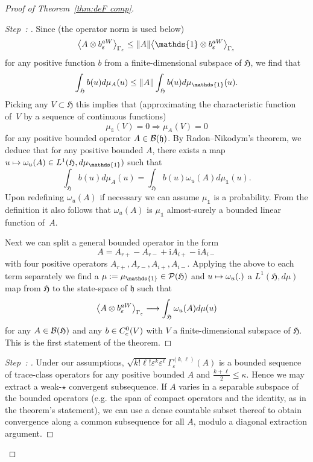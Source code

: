 \documentclass[10pt]{amsart}
\theoremstyle{definition}\newtheorem{defi}[theo]{Definition}\newtheorem{rema}[theo]{Remark}\newtheorem{exam}[theo]{Example}\newtheorem{exem}[theo]{Example}\newtheorem{nota}[theo]{Notation}
\newcommand{\im}{\mathrm{i}}
\newcommand{\gH}{\mathfrak{H}}
\newcommand{\gh}{\mathfrak{h}}
\newcommand{\cB}{\mathcal{B}}
\newcommand{\cP}{\mathcal{P}}
\newcommand{\1}{\mathds{1}}
\newcommand{\eps}{\varepsilon}
\let\oldin\in
\renewcommand{\in}{\mathchoice{\oldin}{\oldin}{\,\oldin\,}{\,\oldin\,}}
\renewcommand*{\to}{\mathchoice{\longrightarrow}{\rightarrow}{\rightarrow}{\rightarrow}}
\let\oldmapsto\mapsto
\renewcommand*{\mapsto}{\mathchoice{\longmapsto}{\oldmapsto}{\oldmapsto}{\oldmapsto}}
\newcounter{setofstep}
\newcounter{step}[setofstep]
\newenvironment{step}[1][]{\refstepcounter{step}\begin{proof}[{Step~\thestep\if#1\empty\else: #1\fi}]}{\let\qed\relax\end{proof}}
\let\originalleft\left
\let\originalright\right
\renewcommand{\left}{\mathopen{}\mathclose\bgroup\originalleft}
\renewcommand{\right}{\aftergroup\egroup\originalright}
\newenvironment{proofc}[1][\proofname]{\begin{proof}[#1]}{\end{proof}}
\begin{document}
\begin{proofc}[Proof of Theorem~\ref{thm:deF comp}]
\begin{step}
Since (the operator norm is used below)
\begin{equation*}
\left\langle A \otimes b_{\eps}^{aW}\right\rangle _{\Gamma_\eps} \leq \left\| A \right\| \left\langle \1 \otimes b_{\eps}^{aW}\right\rangle _{\Gamma_\eps}
\end{equation*}
for any positive function $b$ from a finite-dimensional subspace of $\gH$, we find that
\begin{equation*}
\int_ \gH b(u) d\mu_A (u) \leq \left\| A \right\| \int_ \gH b(u) d\mu_\1 (u).
\end{equation*}
Picking any $V \subset \gH$ this implies that (approximating the characteristic function of~$V$ by a sequence of continuous functions)
\begin{equation*}
\mu_\1 (V) = 0 \Rightarrow \mu_A (V) = 0
\end{equation*}
for any positive
bounded operator $A\in \cB (\gh)$. By Radon--Nikodym's theorem, we deduce that for any positive bounded $A$, there exists a map $u\mapsto\omega_u (A) \in L^1 (\gH, d\mu_\1)$ such that
\begin{equation*}
\int_ \gH b(u) d\mu_A (u) = \int_ \gH b(u) \omega_u(A) d\mu_\1 (u).
\end{equation*}
Upon redefining $\omega_u(A)$ if necessary we can assume $\mu_\1$ is a probability. From the definition it also follows that $\omega_u(A)$ is $\mu_\1$ almost-surely a bounded linear function of~$A$.

Next we can split a general bounded operator in the form
\begin{equation}\label{eq:split op}
A = A_{r+} - A_{r-} + \im A_{i+} - \im A_{i-}
\end{equation}
with four positive operators $A_{r+},A_{r-},A_{i+},A_{i-}$. Applying the above to each term separately we find a $\mu:= \mu_\1 \in \cP(\gH)$ and $u\mapsto \omega_u (.)$ a $L^1 (\gH,d\mu)$ map from $\gH$ to the state-space of $\gh$ such that
\begin{equation*}
\left\langle A \otimes b_{\eps}^{aW}\right\rangle _{\Gamma_\eps} \to \int_ \gH \omega_u(A) d\mu (u)
\end{equation*}
for any $A\in \cB(\gH)$ and any $b\in C^0_c (V)$ with $V$ a finite-dimensional subspace of $\gH$. This is the first statement of the theorem.
\end{step}

\begin{step}
Under our assumptions, $\sqrt{k! \ell ! \eps ^k \eps^\ell}\Gamma_\eps ^{(k,\ell)} (A)$ is a bounded sequence of trace-class operators for any positive bounded $A$ and $\frac{k+\ell}{2}\leq \kappa$. Hence we may extract a weak-$\star$ convergent subsequence. If $A$ varies in a separable subspace of the bounded operators (e.g. the span of compact operators and the identity, as in the theorem's statement), we can use a dense countable subset thereof to obtain convergence along a common subsequence for all $A$, modulo a diagonal extraction argument.


\end{step}
\end{proofc}
\end{document}
